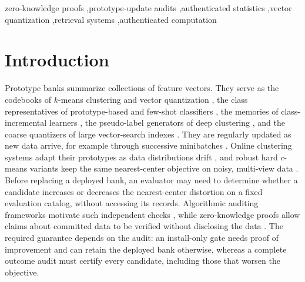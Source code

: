 \documentclass[5p,times,twocolumn]{elsarticle}
\begin{document}
\begin{frontmatter}

\begin{keyword}
zero-knowledge proofs \sep prototype-update audits \sep authenticated statistics
\sep vector quantization \sep retrieval systems \sep authenticated computation
\end{keyword}
\end{frontmatter}


\section{Introduction}
\label{sec:introduction}


Prototype banks summarize collections of feature vectors. They serve as
the codebooks of $k$-means clustering and vector quantization
\cite{lloyd1982least,gray1984vector,ikotun2023kmeans}, the class
representatives of prototype-based and few-shot classifiers
\cite{biehl2016prototype,snell2017prototypical}, the memories of
class-incremental learners \cite{rebuffi2017icarl,gomezvilla2024ldc},
the pseudo-label generators of deep clustering
\cite{caron2018deep}, and the coarse quantizers of large vector-search
indexes \cite{jegou2011product,johnson2021billion}. They are regularly
updated as new data arrive, for example through successive minibatches
\cite{sculley2010web}. Online clustering systems adapt their prototypes as data distributions
drift \cite{corradini2025online}, and robust hard $c$-means variants keep
the same nearest-center objective on noisy, multi-view data
\cite{liu2025robust}. Before replacing a deployed bank, an evaluator
may need to determine whether a candidate increases or decreases the
nearest-center distortion on a fixed evaluation catalog, without
accessing its records. Algorithmic auditing frameworks motivate such
independent checks \cite{raji2020closing}, while zero-knowledge proofs
allow claims about committed data to be verified without disclosing
the data \cite{goldwasser1989knowledge,waiwitlikhit2024zkaudit,south2024verifiable}.
The required guarantee depends on the audit: an install-only gate
needs proof of improvement and can retain the deployed bank otherwise,
whereas a complete outcome audit must certify every candidate,
including those that worsen the objective.
\end{document}
